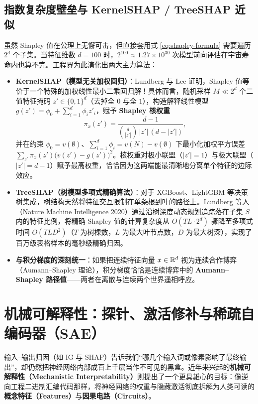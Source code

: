 \subsection{指数复杂度壁垒与 KernelSHAP / TreeSHAP 近似}

虽然 Shapley 值在公理上无懈可击，但直接套用式 \eqref{eq:shapley-formula} 需要遍历 $2^d$ 个子集。当特征维数 $d = 100$ 时，$2^{100} \approx 1.27 \times 10^{30}$ 次模型前向评估在宇宙寿命内也算不完。工程界为此演化出两大主力算法：
\begin{itemize}
  \item \textbf{KernelSHAP（模型无关加权回归）}：Lundberg 与 Lee 证明，Shapley 值等价于一个特殊的加权线性最小二乘回归解！具体而言，随机采样 $M \ll 2^d$ 个二值特征掩码 $z' \in \{0, 1\}^d$（去掉全 $0$ 与全 $1$），构造解释线性模型 $g(z') = \phi_0 + \sum_{i=1}^d \phi_i z'_i$，赋予 \textbf{Shapley 核权重}
  \[
    \pi_x(z') = \frac{d - 1}{\binom{d}{|z'|}\,|z'|\,(d - |z'|)},
  \]
  并在约束 $\phi_0 = v(\emptyset)$、$\sum_{i=1}^d \phi_i = v(N) - v(\emptyset)$ 下最小化加权平方误差 $\sum_{z'} \pi_x(z')\big(v(z') - g(z')\big)^2$。核权重对极小联盟（$|z'|=1$）与极大联盟（$|z'|=d-1$）赋予最高权重，恰恰因为这两端能最清晰地分离单个特征的边际效应。
  \item \textbf{TreeSHAP（树模型多项式精确算法）}：对于 XGBoost、LightGBM 等决策树集成，树结构天然将特征交互限制在单条根到叶的路径上。Lundberg 等人（Nature Machine Intelligence 2020）通过沿树深度动态规划追踪落在子集 $S$ 内的特征比例，将精确 Shapley 值的计算复杂度从 $O(T L \cdot 2^d)$ 骤降至多项式时间 $O(T L D^2)$（$T$ 为树棵数，$L$ 为最大叶节点数，$D$ 为最大树深），实现了百万级表格样本的毫秒级精确归因。
  \item \textbf{与积分梯度的深刻统一}：如果把连续特征向量 $x \in \mathbb{R}^d$ 视为连续合作博弈（Aumann--Shapley 理论），积分梯度恰恰是连续博弈中的 \textbf{Aumann--Shapley 路径值}——两者在离散与连续两个世界遥相呼应。
\end{itemize}

\section{机械可解释性：探针、激活修补与稀疏自编码器（SAE）}

输入--输出归因（如 IG 与 SHAP）告诉我们“哪几个输入词或像素影响了最终输出”，却仍然把神经网络内部成百上千层当作不可见的黑盒。近年来兴起的\textbf{机械可解释性（Mechanistic Interpretability）}则提出了一个更具雄心的目标：像逆向工程二进制汇编代码那样，将神经网络的权重与隐藏激活彻底拆解为人类可读的\textbf{概念特征（Features）}与\textbf{因果电路（Circuits）}。

